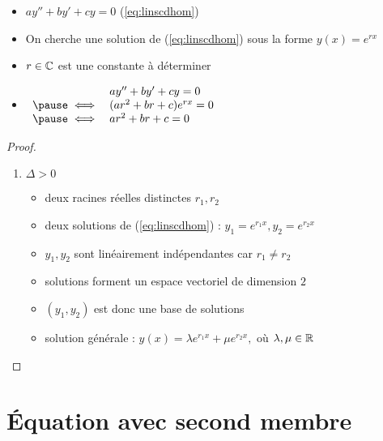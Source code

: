 \begin{frame}
\begin{itemize}
  \item $ay''+by'+cy=0$ \quad (\ref{eq:linscdhom})
  \pause
  \item On cherche une solution de (\ref{eq:linscdhom}) sous la forme 
$y(x)=e^{rx}$
\pause
  \item $r \in \mathbb{C}$ est une constante à déterminer
  \pause
  \item $\begin{array}{rl}
     & ay''+by'+cy=0 \\
     \pause
\iff & (ar^2+br+c)e^{rx}=0 \\
\pause
\iff & ar^2+br+c=0
\end{array}$
\end{itemize}
\pause
\begin{proof}
\pause
\begin{enumerate}
  \item  $\Delta>0$
  \pause
  \begin{itemize}
    \item deux racines réelles distinctes $r_1, r_2$
    \pause
    \item deux solutions de (\ref{eq:linscdhom}) : $y_1=e^{r_1x}, y_2=e^{r_2x}$
    \pause
    \item $y_1,y_2$ sont linéairement indépendantes car $r_1 \neq r_2$
    \pause
    \item solutions forment un espace vectoriel de dimension $2$
    \pause
    \item $(y_1,y_2)$ est donc une base de solutions
    \pause
    \item solution générale : $y(x) = \lambda e^{r_1x} + \mu e^{r_2x},$ où $\lambda,
\mu\in\mathbb{R}$
  \end{itemize}

\end{enumerate}
\end{proof}
\end{frame}


\section*{\'Equation avec second membre}

